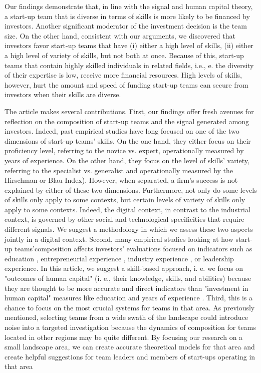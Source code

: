\documentclass[12pt]{article}
\begin{document}
Our findings demonstrate that, in line with the signal and human capital theory, a start-up team that is diverse in terms of skills is more likely to be financed by investors. Another significant moderator of the investment decision is the team size. On the other hand, consistent with our arguments, we discovered that investors favor start-up teams that have (i) either a high level of skills, (ii) either a high level of variety of skills, but not both at once. Because of this, start-up teams that contain highly skilled individuals in related fields, i.e., e. the diversity of their expertise is low, receive more financial resources. High levels of skills, however, hurt the amount and speed of funding start-up teams can secure from investors when their skills are diverse.

The article makes several contributions. First, our findings offer fresh avenues for reflection on the composition of start-up teams and the signal generated among investors. Indeed, past empirical studies have long focused on one of the two dimensions of start-up teams' skills. On the one hand, they either focus on their proficiency level, referring to the novice vs. expert, operationally measured by years of experience. On the other hand, they focus on the level of skills' variety, referring to the specialist vs. generalist and operationally measured by the Hirschman or Blau Index). However, when separated, a firm's success is not explained by either of these two dimensions. Furthermore, not only do some levels of skills only apply to some contexts, but certain levels of variety of skills only apply to some contexts. Indeed, the digital context, in contrast to the industrial context, is governed by other social and technological specificities that require different signals. We suggest a methodology in which we assess these two aspects jointly in a digital context. Second, many empirical studies looking at how start-up teams'composition affects investors' evaluations focused on indicators such as education \citep{franke2008venture}, entrepreneurial experience \citep{beckman2007early}, industry experience \citep{becker2015new}, or leadership experience\citep{hoenig2015quality}. In this article, we suggest a skill-based approach, i. e. we focus on "outcomes of human capital" (i. e., their knowledge, skills, and abilities) because they are thought to be more accurate and direct indicators than "investment in human capital" measures like education and years of experience \citep{unger2011human, marvel2016human}. Third, this is a chance to focus on the most crucial systems for teams in that area. As previously mentioned, selecting teams from a wide swath of the landscape could introduce noise into a targeted investigation because the dynamics of composition for teams located in other regions may be quite different. By focusing our research on a small landscape area, we can create accurate theoretical models for that area and create helpful suggestions for team leaders and members of start-ups operating in that area
\end{document}
